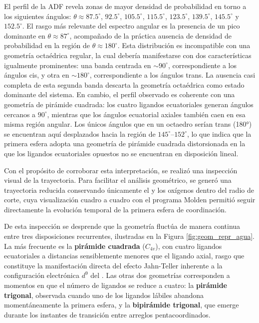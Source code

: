 El perfil de la ADF revela zonas de mayor densidad de probabilidad en torno a los siguientes ángulos: $\theta \approx 87.5^\circ$, $92.5^\circ$, $105.5^\circ$, $115.5^\circ$, $123.5^\circ$, $139.5^\circ$, $145.5^\circ$ y $152.5^\circ$. El rasgo más relevante del espectro angular es la presencia de un pico dominante en $\theta \approx 87^\circ$, acompañado de la práctica ausencia de densidad de probabilidad en la región de $\theta \approx 180^\circ$. Esta distribución es incompatible con una geometría octaédrica regular, la cual debería manifestarse con dos características igualmente prominentes: una banda centrada en $\sim 90^\circ$, correspondiente a los ángulos cis, y otra en $\sim 180^\circ$, correspondiente a los ángulos trans. La ausencia casi completa de esta segunda banda descarta la geometría octaédrica como estado dominante del sistema. En cambio, el perfil observado es coherente con una geometría de pirámide cuadrada: los cuatro ligandos ecuatoriales generan ángulos  cercanos a $90^\circ$, mientras que los ángulos ecuatorial axiales también caen en esa misma región angular. Los únicos ángulos que en un octaedro serían trans (180°) se encuentran aquí desplazados hacia la región de $145^\circ$--$152^\circ$, lo que indica que la primera esfera adopta una geometría de pirámide cuadrada distorsionada en la que los ligandos ecuatoriales opuestos no se encuentran en disposición lineal.

Con el propósito de corroborar esta interpretación, se realizó una inspección visual de la trayectoria. Para facilitar el análisis geométrico, se generó una trayectoria reducida conservando únicamente el  y los oxígenos dentro del radio de corte, cuya visualización cuadro a cuadro con el programa Molden \cite{Schaftenaar2000} permitió seguir directamente la evolución temporal de la primera esfera de coordinación.

De esta inspección se desprende que la geometría fluctúa de manera continua entre tres disposiciones recurrentes, ilustradas en la Figura \ref{fig:geom_repr_agua}. La más frecuente es la \textbf{pirámide cuadrada} ($C_{4v}$), con cuatro ligandos ecuatoriales a distancias sensiblemente menores que el ligando axial, rasgo que constituye la manifestación directa del efecto Jahn-Teller  inherente a la configuración electrónica $d^9$ del . Las otras dos geometrías corresponden a momentos en que el número de ligandos se reduce a cuatro: la \textbf{pirámide trigonal}, observada cuando uno de los ligandos lábiles abandona momentáneamente la primera esfera, y la \textbf{bipirámide trigonal}, que emerge durante los instantes de transición entre arreglos pentacoordinados.

